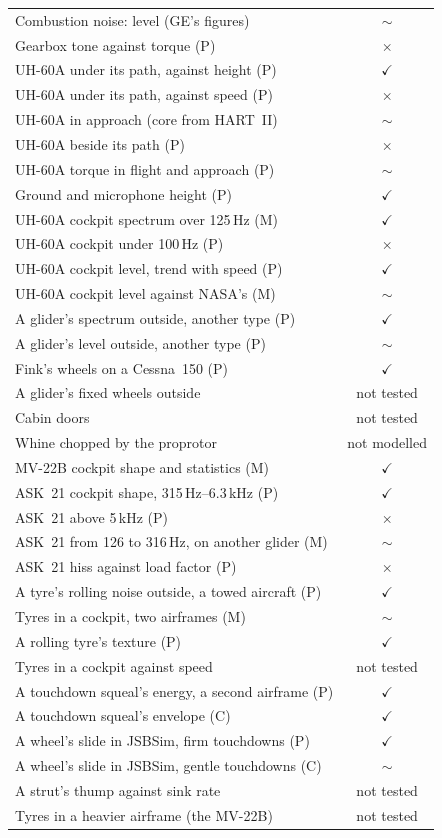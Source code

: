 \documentclass[10pt,a4paper,twocolumn]{article}
\newcommand{\ok}{\textcolor{green!45!black}{\ensuremath{\checkmark}}}
\newcommand{\nok}{\textcolor{red!70!black}{\ensuremath{\times}}}
\newcommand{\pok}{\textcolor{orange!85!black}{\ensuremath{\sim}}}
\begin{document}
\begin{table}[t]
\begin{tabularx}{\columnwidth}{@{}>{\raggedright\arraybackslash}Xc@{}}
Combustion noise: level (GE's figures) & \pok \\
Gearbox tone against torque (P) & \nok \\
UH-60A under its path, against height (P) & \ok \\
UH-60A under its path, against speed (P) & \nok \\
UH-60A in approach (core from HART~II) & \pok \\
UH-60A beside its path (P) & \nok \\
UH-60A torque in flight and approach (P) & \pok \\
Ground and microphone height (P) & \ok \\
UH-60A cockpit spectrum over 125\,Hz (M) & \ok \\
UH-60A cockpit under 100\,Hz (P) & \nok \\
UH-60A cockpit level, trend with speed (P) & \ok \\
UH-60A cockpit level against NASA's (M) & \pok \\
A glider's spectrum outside, another type (P) & \ok \\
A glider's level outside, another type (P) & \pok \\
Fink's wheels on a Cessna~150 (P) & \ok \\
A glider's fixed wheels outside & not tested \\
Cabin doors & not tested \\
Whine chopped by the proprotor & not modelled \\
MV-22B cockpit shape and statistics (M) & \ok \\
ASK~21 cockpit shape, 315\,Hz--6.3\,kHz (P) & \ok \\
ASK~21 above 5\,kHz (P) & \nok \\
ASK~21 from 126 to 316\,Hz, on another glider (M) & \pok \\
ASK~21 hiss against load factor (P) & \nok \\
A tyre's rolling noise outside, a towed aircraft (P) & \ok \\
Tyres in a cockpit, two airframes (M) & \pok \\
A rolling tyre's texture (P) & \ok \\
Tyres in a cockpit against speed & not tested \\
A touchdown squeal's energy, a second airframe (P) & \ok \\
A touchdown squeal's envelope (C) & \ok \\
A wheel's slide in JSBSim, firm touchdowns (P) & \ok \\
A wheel's slide in JSBSim, gentle touchdowns (C) & \pok \\
A strut's thump against sink rate & not tested \\
Tyres in a heavier airframe (the MV-22B) & not tested \\
\bottomrule
\end{tabularx}
\end{table}
\end{document}
